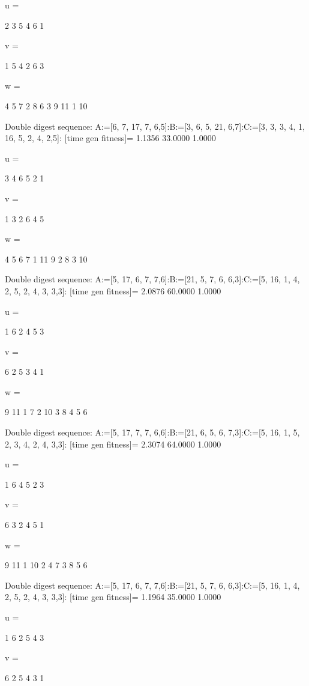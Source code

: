 u =

     2     3     5     4     6     1


v =

     1     5     4     2     6     3


w =

     4     5     7     2     8     6     3     9    11     1    10

Double digest sequence:
A:=[6, 7, 17, 7, 6,5]:B:=[3, 6, 5, 21, 6,7]:C:=[3, 3, 3, 4, 1, 16, 5, 2, 4, 2,5]:
[time gen fitness]=
    1.1356   33.0000    1.0000


u =

     3     4     6     5     2     1


v =

     1     3     2     6     4     5


w =

     4     5     6     7     1    11     9     2     8     3    10

Double digest sequence:
A:=[5, 17, 6, 7, 7,6]:B:=[21, 5, 7, 6, 6,3]:C:=[5, 16, 1, 4, 2, 5, 2, 4, 3, 3,3]:
[time gen fitness]=
    2.0876   60.0000    1.0000


u =

     1     6     2     4     5     3


v =

     6     2     5     3     4     1


w =

     9    11     1     7     2    10     3     8     4     5     6

Double digest sequence:
A:=[5, 17, 7, 7, 6,6]:B:=[21, 6, 5, 6, 7,3]:C:=[5, 16, 1, 5, 2, 3, 4, 2, 4, 3,3]:
[time gen fitness]=
    2.3074   64.0000    1.0000


u =

     1     6     4     5     2     3


v =

     6     3     2     4     5     1


w =

     9    11     1    10     2     4     7     3     8     5     6

Double digest sequence:
A:=[5, 17, 6, 7, 7,6]:B:=[21, 5, 7, 6, 6,3]:C:=[5, 16, 1, 4, 2, 5, 2, 4, 3, 3,3]:
[time gen fitness]=
    1.1964   35.0000    1.0000


u =

     1     6     2     5     4     3


v =

     6     2     5     4     3     1


